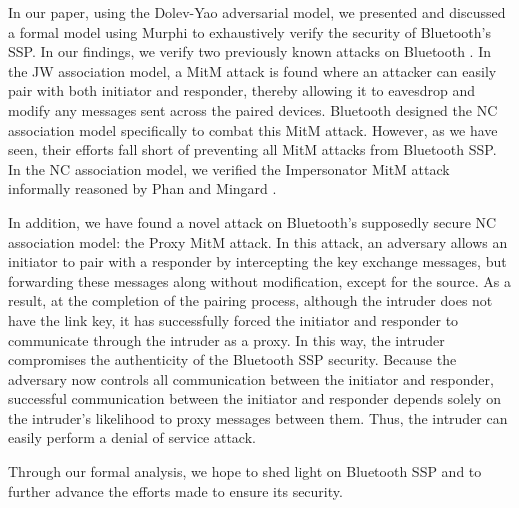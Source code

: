 \documentclass{acm_proc_article-sp}
\begin{document}
In our paper, using the Dolev-Yao \cite{dolev:yao} adversarial model, we presented and discussed a formal model using Murphi to exhaustively verify the security of Bluetooth's SSP. In our findings, we verify two previously known attacks on Bluetooth \cite{phan:mingard}. In the JW association model, a MitM attack is found where an attacker can easily pair with both initiator and responder, thereby allowing it to eavesdrop and modify any messages sent across the paired devices. Bluetooth designed the NC association model specifically to combat this MitM attack. However, as we have seen, their efforts fall short of preventing all MitM attacks from Bluetooth SSP. In the NC association model, we verified the Impersonator MitM attack informally reasoned by Phan and Mingard \cite{phan:mingard}.

In addition, we have found a novel attack on Bluetooth's supposedly secure NC association model: the Proxy MitM attack. In this attack, an adversary allows an initiator to pair with a responder by intercepting the key exchange messages, but forwarding these messages along without modification, except for the source. As a result, at the completion of the pairing process, although the intruder does not have the link key, it has successfully forced the initiator and responder to communicate through the intruder as a proxy. In this way, the intruder compromises the authenticity of the Bluetooth SSP security. Because the adversary now controls all communication between the initiator and responder, successful communication between the initiator and responder depends solely on the intruder's likelihood to proxy messages between them. Thus, the intruder can easily perform a denial of service attack.

Through our formal analysis, we hope to shed light on Bluetooth SSP and to further advance the efforts made to ensure its security.


\nocite{*}

\end{document}
